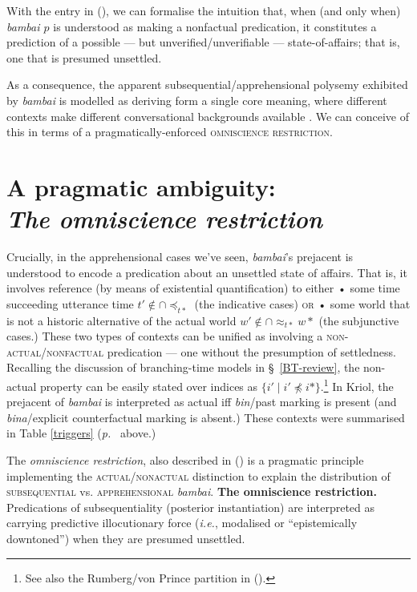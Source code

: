 \xe


With the entry in (\lastx), we can formalise the intuition that, when (and only when) \textit{bambai $p$} is understood as making a nonfactual predication, it constitutes a prediction of a possible --- but unverified/unverifiable --- state-of-affairs; that is, one that is presumed unsettled. 


As a consequence, the apparent subsequential/apprehensional polysemy exhibited by \textit{bambai} is modelled as deriving form a single core meaning, where different contexts make different conversational backgrounds available \citep[\textit{cf.}][55\textit{ff}]{Kratzer2012}. We can conceive of this in terms of a pragmatically-enforced \textsc{omniscience restriction.}


\section[The omniscience restriction]{A pragmatic ambiguity:\\\it The omniscience restriction}


 Crucially, in the apprehensional cases we've seen, \textit{bambai}'s prejacent is understood to encode a predication about an unsettled state of affairs. That is, it involves reference (by means of existential quantification) to either • some time  succeeding utterance time $ t'\notin\cap\preccurlyeq_{t*} $ (the indicative cases) \textsc{or} • some world that is not a historic alternative of the actual world $w'\notin\cap\approx_{t*}w* $ (the subjunctive cases.) These two types of contexts can be unified as involving a \textsc{non-actual}/\textsc{nonfactual} predication --- one without the presumption of settledness. Recalling the discussion of branching-time models in \S~\ref{BT-review}, the non-actual property can be easily stated over indices as $ \{i'\mid i'\not\preccurlyeq i*\} $.\footnote{See also the Rumberg/von Prince partition in ().} In Kriol, the prejacent of \textit{bambai} is interpreted as actual if{f} \textit{bin}/past marking is present (and \textit{bina}/explicit counterfactual marking is absent.) These contexts were summarised in Table \ref{triggers} (\textit{p.}~\pageref{triggers} above.)
 
 

The \textit{omniscience restriction}, also described in () is a pragmatic principle implementing the \textsc{actual/nonactual} distinction to explain the distribution of \textsc{subsequential} vs. \textsc{apprehensional} \textit{bambai}.
\pex \textbf{The omniscience restriction.}
Predications of subsequentiality (posterior instantiation) are interpreted as carrying predictive illocutionary force (\textit{i.e.}, modalised or ``epistemically downtoned'') when they are presumed unsettled.
\xe

